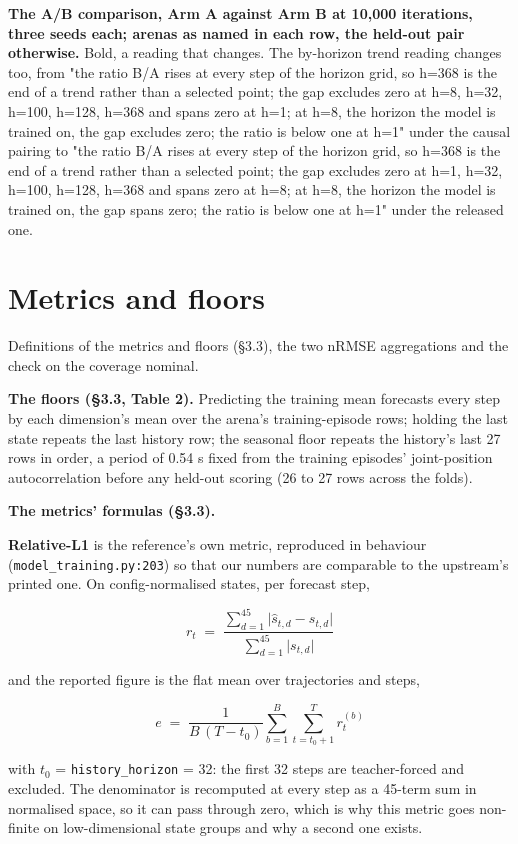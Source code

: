 \documentclass[10pt]{article}
\begin{document}
\textbf{The A/B comparison, Arm A against Arm B at 10,000 iterations, three seeds each; arenas as named in each row, the held-out pair otherwise.} Bold, a reading that changes. The by-horizon trend reading changes too, from "the ratio B/A rises at every step of the horizon grid, so h=368 is the end of a trend rather than a selected point; the gap excludes zero at h=8, h=32, h=100, h=128, h=368 and spans zero at h=1; at h=8, the horizon the model is trained on, the gap excludes zero; the ratio is below one at h=1" under the causal pairing to "the ratio B/A rises at every step of the horizon grid, so h=368 is the end of a trend rather than a selected point; the gap excludes zero at h=1, h=32, h=100, h=128, h=368 and spans zero at h=8; at h=8, the horizon the model is trained on, the gap spans zero; the ratio is below one at h=1" under the released one.


\section{Metrics and floors}

Definitions of the metrics and floors (\S{}3.3), the two nRMSE aggregations and the check on the coverage nominal.

\textbf{The floors (\S{}3.3, Table 2).} Predicting the training mean forecasts every step by each dimension's mean over the arena's training-episode rows; holding the last state repeats the last history row; the seasonal floor repeats the history's last 27 rows in order, a period of 0.54 s fixed from the training episodes' joint-position autocorrelation before any held-out scoring (26 to 27 rows across the folds).

\textbf{The metrics' formulas (\S{}3.3).}

\textbf{Relative-L1} is the reference's own metric, reproduced in behaviour (\texttt{model\_training.py:203}) so that our numbers are comparable to the upstream's printed one. On config-normalised states, per forecast step,

\[r_t \;=\; \frac{\sum_{d=1}^{45}\bigl|\hat{s}_{t,d}-s_{t,d}\bigr|}{\sum_{d=1}^{45}\bigl|s_{t,d}\bigr|}\]

and the reported figure is the flat mean over trajectories and steps,

\[e \;=\; \frac{1}{B\,(T-t_0)}\sum_{b=1}^{B}\sum_{t=t_0+1}^{T} r_{t}^{(b)}\]

with $t_0$ = \texttt{history\_horizon} = 32: the first 32 steps are teacher-forced and excluded. The denominator is recomputed at every step as a 45-term sum in normalised space, so it can pass through zero, which is why this metric goes non-finite on low-dimensional state groups and why a second one exists.
\end{document}
